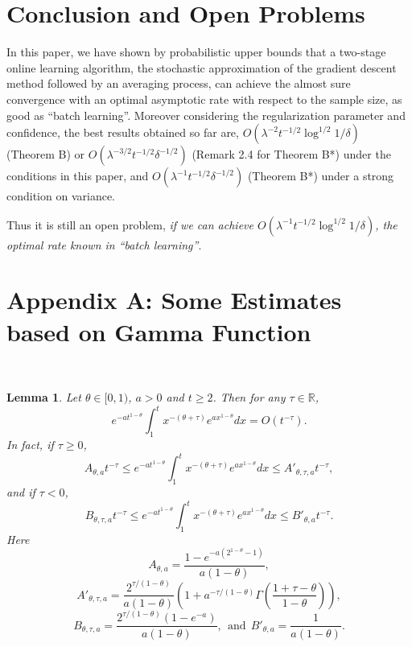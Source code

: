 \documentclass[twoside,twocolumn,journal]{IEEEtran}
\newtheorem{lem}[thm]{Lemma}
\def\R{{\mathbb R}}        %
\begin{document}
\section{Conclusion and Open Problems}

In this paper, we have shown by probabilistic upper bounds that a two-stage online learning algorithm,
the stochastic approximation of the gradient descent method followed by an averaging process, can achieve
the almost sure convergence with an optimal asymptotic rate with respect to the sample size, as good as ``batch learning''.
Moreover considering the regularization parameter and confidence, the best results obtained so far are,
$O(\lambda^{-2} t^{-1/2} \log^{1/2} 1/\delta)$ (Theorem B) or $O(\lambda^{-3/2} t^{-1/2} \delta^{-1/2})$ (Remark 2.4 for Theorem B*)
under the conditions in this paper, and $O(\lambda^{-1} t^{-1/2} \delta^{-1/2})$ (Theorem B*) under a strong condition on variance.

Thus it is still an open problem, \emph{if we can achieve $O(\lambda^{-1} t^{-1/2} \log^{1/2}1/\delta)$, the optimal
rate known in ``batch learning''}.


\section*{Appendix A: Some Estimates based on Gamma Function}\

\renewcommand{\thesection}{A}
\setcounter{equation}{0}
\setcounter{thm}{0}
\renewcommand{\thethm}{A.\arabic{thm}}
\renewcommand{\theequation}{A-\arabic{equation}}

\begin{lem} \label{lem:key1} Let $\theta\in [0,1)$, $a>0$ and $t\geq 2$. Then for any $\tau\in \R$,
\[ e^{-a t^{1-\theta}} \int_1^t x^{-(\theta+\tau)} e^{a x^{1-\theta}} d x = O(t^{-\tau}). \]
In fact, if $\tau\geq 0$,
\[  A_{\theta,a} t^{-\tau} \leq e^{-a t^{1-\theta}} \int_1^t x^{-(\theta+\tau)} e^{a x^{1-\theta}} d x \leq A'_{\theta,\tau,a} t^{-\tau}, \]
and if $\tau<0$,
\[  B_{\theta,\tau,a} t^{-\tau} \leq e^{-a t^{1-\theta}} \int_1^t x^{-(\theta+\tau)} e^{a x^{1-\theta}} d x  \leq B'_{\theta,a}t^{-\tau}. \]
Here
\[ A_{\theta,a} =\frac{1-e^{-a(2^{1-\theta}-1)}}{a(1-\theta)} , \]
\[ A'_{\theta,\tau,a} =
\frac{2^{\tau/(1-\theta)}}{a(1-\theta)} \left(1+a^{-\tau/(1-\theta)} \Gamma \left( \frac{1+\tau-\theta}{1-\theta}\right)\right), \]
\[ B_{\theta,\tau,a} = \frac{2^{\tau/(1-\theta)}(1-e^{-a})}{a(1-\theta)},\ \ \mbox{and}\ \  B'_{\theta,a} = \frac{1}{  a(1-\theta)}. \]
\end{lem}
\end{document}
